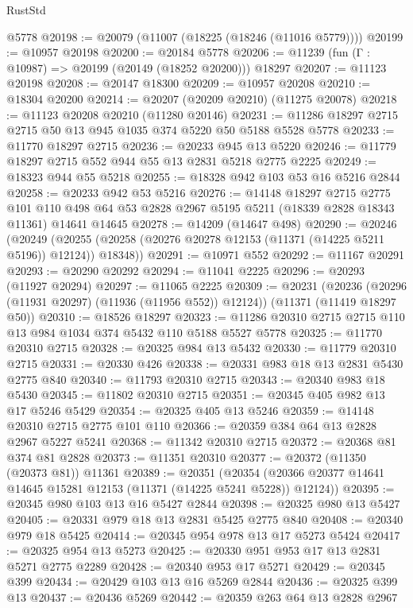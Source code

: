 \begin{lexlean}{RustStd}
\begin{coremodule}
{\begin{coremodule}
{{{{{{{{{{{{{{{{{{{{{{{{{{{{{{{{{    @5778
@20198 := @20079 (@11007 (@18225 (@18246 (@11016 @5779))))
@20199 := @10957 @20198
@20200 := @20184 @5778
@20206 := @11239 (fun (Γ : @10987) => @20199 (@20149 (@18252 @20200))) @18297
@20207 := @11123 @20198
@20208 := @20147 @18300
@20209 := @10957 @20208
@20210 := @18304 @20200
@20214 := @20207 (@20209 @20210) (@11275 @20078)
@20218 := @11123 @20208 @20210 (@11280 @20146)
@20231 := @11286 @18297 @2715 @2715 @50 @13 @945 @1035 @374 @5220 @50 @5188 @5528 @5778
@20233 := @11770 @18297 @2715
@20236 := @20233 @945 @13 @5220
@20246 := @11779 @18297 @2715 @552 @944 @55 @13 @2831 @5218 @2775 @2225
@20249 := @18323 @944 @55 @5218
@20255 := @18328 @942 @103 @53 @16 @5216 @2844
@20258 := @20233 @942 @53 @5216
@20276 := @14148
    @18297
    @2715
    @2775
    @101
    @110
    @498
    @64
    @53
    @2828
    @2967
    @5195
    @5211
    (@18339 @2828 @18343 @11361)
    @14641
    @14645
@20278 := @14209 (@14647 @498)
@20290 := @20246
    (@20249 (@20255 (@20258 (@20276 @20278 @12153 (@11371 (@14225 @5211 @5196)) @12124)) @18348))
@20291 := @10971 @552
@20292 := @11167 @20291
@20293 := @20290 @20292
@20294 := @11041 @2225
@20296 := @20293 (@11927 @20294)
@20297 := @11065 @2225
@20309 := @20231
    (@20236 (@20296 (@11931 @20297) (@11936 (@11956 @552)) @12124))
    (@11371 (@11419 @18297 @50))
@20310 := @18526 @18297
@20323 := @11286 @20310 @2715 @2715 @110 @13 @984 @1034 @374 @5432 @110 @5188 @5527 @5778
@20325 := @11770 @20310 @2715
@20328 := @20325 @984 @13 @5432
@20330 := @11779 @20310 @2715
@20331 := @20330 @426
@20338 := @20331 @983 @18 @13 @2831 @5430 @2775 @840
@20340 := @11793 @20310 @2715
@20343 := @20340 @983 @18 @5430
@20345 := @11802 @20310 @2715
@20351 := @20345 @405 @982 @13 @17 @5246 @5429
@20354 := @20325 @405 @13 @5246
@20359 := @14148 @20310 @2715 @2775 @101 @110
@20366 := @20359 @384 @64 @13 @2828 @2967 @5227 @5241
@20368 := @11342 @20310 @2715
@20372 := @20368 @81 @374 @81 @2828
@20373 := @11351 @20310
@20377 := @20372 (@11350 (@20373 @81)) @11361
@20389 := @20351
    (@20354 (@20366 @20377 @14641 @14645 @15281 @12153 (@11371 (@14225 @5241 @5228)) @12124))
@20395 := @20345 @980 @103 @13 @16 @5427 @2844
@20398 := @20325 @980 @13 @5427
@20405 := @20331 @979 @18 @13 @2831 @5425 @2775 @840
@20408 := @20340 @979 @18 @5425
@20414 := @20345 @954 @978 @13 @17 @5273 @5424
@20417 := @20325 @954 @13 @5273
@20425 := @20330 @951 @953 @17 @13 @2831 @5271 @2775 @2289
@20428 := @20340 @953 @17 @5271
@20429 := @20345 @399
@20434 := @20429 @103 @13 @16 @5269 @2844
@20436 := @20325 @399 @13
@20437 := @20436 @5269
@20442 := @20359 @263 @64 @13 @2828 @2967
}}}}}}}}}}}}}}}}}}}}}}}}}}}}}}}}}
\end{coremodule}}
\end{coremodule}
\end{lexlean}
